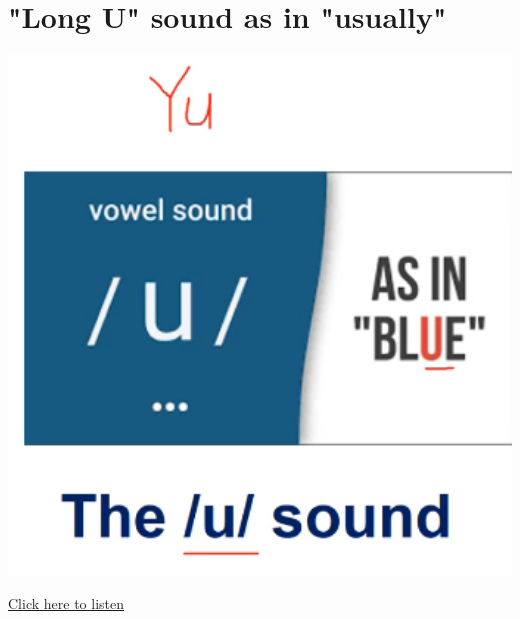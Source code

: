 \section{"Long U" sound as in "usually" }
\begin{center}
\includegraphics[width=1\textwidth]{images/long_u_portrait.png}
\end{center}

\href{https://drive.google.com/file/d/1d3kXrZ-ctq1nlfgTstKuc3zmRYpuEt42/view?usp=sharing}{Click here to listen}

